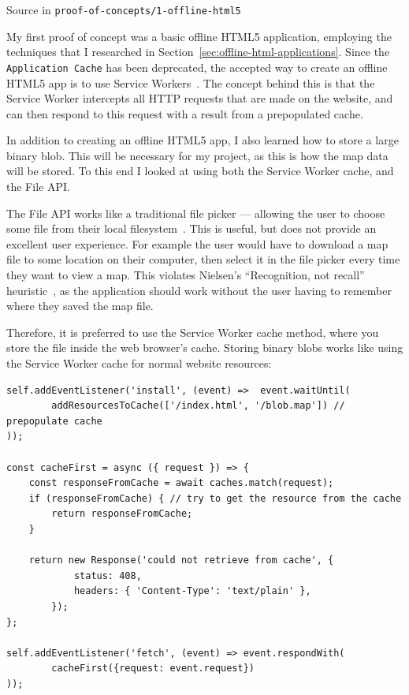 \documentclass{final_report}
\begin{document}
{ \hfill \footnotesize Source in \texttt{proof-of-concepts/1-offline-html5}}

My first proof of concept was a basic offline HTML5 application, employing the techniques that I researched in Section~\ref{sec:offline-html-applications}. Since the \texttt{Application Cache} has been deprecated, the accepted way to create an offline HTML5 app is to use Service Workers~\cite{w3c-service-workers-caches}. The concept behind this is that the Service Worker intercepts all HTTP requests that are made on the website, and can then respond to this request with a result from a prepopulated cache.

In addition to creating an offline HTML5 app, I also learned how to store a large binary blob. This will be necessary for my project, as this is how the map data will be stored. To this end I looked at using both the Service Worker cache, and the File API\@.

The File API works like a traditional file picker --- allowing the user to choose some file from their local filesystem~\cite{w3c-file-api}. This is useful, but does not provide an excellent user experience. For example the user would have to download a map file to some location on their computer, then select it in the file picker every time they want to view a map. This violates Nielsen's ``Recognition, not recall'' heuristic~\cite{nielsen-heuristics}, as the application should work without the user having to remember where they saved the map file.

Therefore, it is preferred to use the Service Worker cache method, where you store the file inside the web browser's cache. Storing binary blobs works like using the Service Worker cache for normal website resources:

\begin{lstlisting}[caption=Using the Service Worker cache]
self.addEventListener('install', (event) =>  event.waitUntil(
        addResourcesToCache(['/index.html', '/blob.map']) // prepopulate cache
));

const cacheFirst = async ({ request }) => {
    const responseFromCache = await caches.match(request);
    if (responseFromCache) { // try to get the resource from the cache
        return responseFromCache;
    }

    return new Response('could not retrieve from cache', {
            status: 408,
            headers: { 'Content-Type': 'text/plain' },
        });
};

self.addEventListener('fetch', (event) => event.respondWith(
        cacheFirst({request: event.request})
));
\end{lstlisting}
\end{document}
